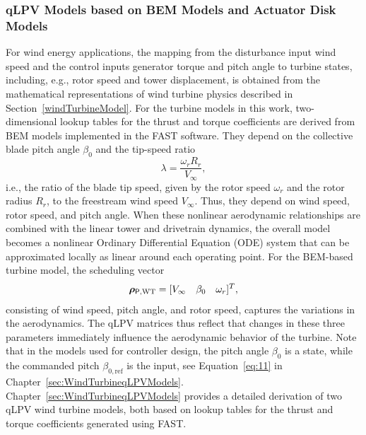 \subsubsection{qLPV Models based on BEM Models and Actuator Disk Models}
\label{sec:quasi-LPVTurbineModel}

For wind energy applications, the mapping from the disturbance input wind speed and the control inputs generator torque and pitch angle to turbine states, including, e.g., rotor speed and tower displacement, is obtained from the mathematical representations of wind turbine physics described in Section~\ref{windTurbineModel}. For the turbine models in this work, two-dimensional lookup tables for the thrust and torque coefficients are derived from BEM models implemented in the FAST software. They depend on the collective blade pitch angle $\beta_0$ and the tip-speed ratio
\begin{equation} \label{eq:lambda}
    \lambda = \frac{\omega_r R_r}{V_\infty},
\end{equation}
i.e., the ratio of the blade tip speed, given by the rotor speed $\omega_r$ and the rotor radius $R_r$, to the freestream wind speed $V_\infty$. Thus, they depend on wind speed, rotor speed, and pitch angle. When these nonlinear aerodynamic relationships are combined with the linear tower and drivetrain dynamics, the overall model becomes a nonlinear Ordinary Differential Equation (ODE) system that can be approximated locally as linear around each operating point. For the BEM-based turbine model, the scheduling vector
\begin{equation} \label{eq:rhoWT}
    \bm{\rho}_{\mathsf{P},\text{WT}} = [V_\infty \quad \beta_0 \quad \omega_r]^T,
\end{equation}
consisting of wind speed, pitch angle, and rotor speed, captures the variations in the aerodynamics. The qLPV matrices thus reflect that changes in these three parameters immediately influence the aerodynamic behavior of the turbine. Note that in the models used for controller design, the pitch angle $\beta_0$ is a state, while the commanded pitch $\beta_{0,\text{ref}}$ is the input, see Equation~\eqref{eq:11} in Chapter~\ref{sec:WindTurbineqLPVModels}. Chapter~\ref{sec:WindTurbineqLPVModels} provides a detailed derivation of two qLPV wind turbine models, both based on lookup tables for the thrust and torque coefficients generated using FAST.

